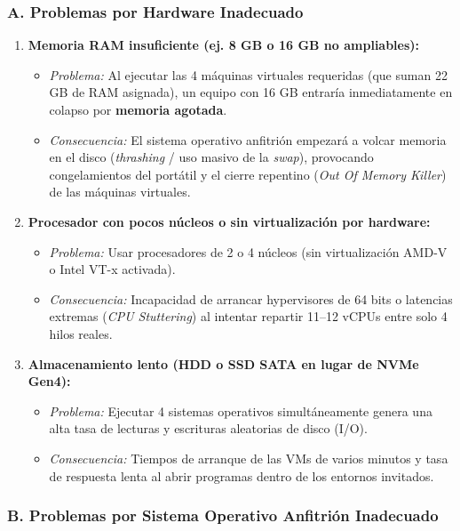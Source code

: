 \documentclass[11.5pt]{article}
\begin{document}
	\subsubsection*{A. Problemas por Hardware Inadecuado}
	
	\begin{enumerate}
		\item \textbf{Memoria RAM insuficiente (ej. 8 GB o 16 GB no ampliables):}
		\begin{itemize}
			\item \textit{Problema:} Al ejecutar las 4 máquinas virtuales requeridas (que suman 22 GB de RAM asignada), un equipo con 16 GB entraría inmediatamente en colapso por \textbf{memoria agotada}.
			\item \textit{Consecuencia:} El sistema operativo anfitrión empezará a volcar memoria en el disco (\textit{thrashing} / uso masivo de la \textit{swap}), provocando congelamientos del portátil y el cierre repentino (\textit{Out Of Memory Killer}) de las máquinas virtuales.
		\end{itemize}
		
		\item \textbf{Procesador con pocos núcleos o sin virtualización por hardware:}
		\begin{itemize}
			\item \textit{Problema:} Usar procesadores de 2 o 4 núcleos (sin virtualización AMD-V o Intel VT-x activada).
			\item \textit{Consecuencia:} Incapacidad de arrancar hypervisores de 64 bits o latencias extremas (\textit{CPU Stuttering}) al intentar repartir 11–12 vCPUs entre solo 4 hilos reales.
		\end{itemize}
		
		\item \textbf{Almacenamiento lento (HDD o SSD SATA en lugar de NVMe Gen4):}
		\begin{itemize}
			\item \textit{Problema:} Ejecutar 4 sistemas operativos simultáneamente genera una alta tasa de lecturas y escrituras aleatorias de disco (I/O).
			\item \textit{Consecuencia:} Tiempos de arranque de las VMs de varios minutos y tasa de respuesta lenta al abrir programas dentro de los entornos invitados.
		\end{itemize}
	\end{enumerate}
	
	\subsubsection*{B. Problemas por Sistema Operativo Anfitrión Inadecuado}
	
\end{document}
